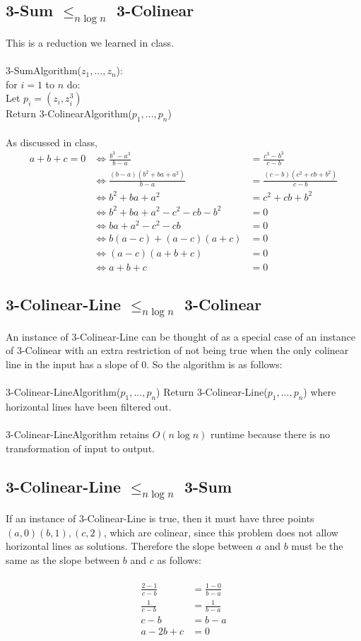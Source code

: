 \documentclass[letterpaper,notitlepage,twoside]{article}
\renewcommand{\iff}{\Leftrightarrow} %
\newcommand\tab[1][1cm]{\hspace*{#1}} %
\begin{document}
\subsection*{3-Sum $\leq_{n \log n}$ 3-Colinear}
This is a reduction we learned in class.
\\\\
3-SumAlgorithm($z_1,...,z_n$):\\
\tab for $i = 1$ to $n$ do:\\
\tab\tab Let $p_i = (z_i, z_i^3)$\\
\tab Return 3-ColinearAlgorithm($p_1,...,p_n$)
\\\\
As discussed in class,
\begin{align*}
a + b + c = 0 &\iff \frac{b^3 - a^3}{b - a} &= \frac{c^3 - b^3}{c - b}\\
&\iff \frac{(b - a)(b^2 + ba + a^2)}{b - a} &= \frac{(c - b)(c^2 + cb + b^2)}{c - b}\\
&\iff b^2 + ba + a^2 &= c^2 + cb + b^2\\
&\iff b^2 + ba + a^2 - c^2 - cb - b^2 &= 0\\
&\iff ba + a^2 - c^2 - cb &= 0\\
&\iff b(a - c) + (a - c)(a + c) &= 0\\
&\iff (a - c)(a + b + c) &= 0\\
&\iff a + b + c &= 0
\end{align*}

\subsection*{3-Colinear-Line $\leq_{n \log n}$  3-Colinear}
An instance of 3-Colinear-Line can be thought of as a special case of an instance of 3-Colinear with an extra restriction of not being true when the only colinear line in the input has a slope of 0. So the algorithm is as follows:
\\\\
3-Colinear-LineAlgorithm($p_1,...,p_n$)
\tab Return 3-Colinear-Line($p_1,...,p_n$) where horizontal lines have been filtered out.
\\\\
3-Colinear-LineAlgorithm retains $O(n \log n)$ runtime because there is no transformation of input to output.

\subsection*{3-Colinear-Line $\leq_{n \log n}$ 3-Sum}
If an instance of 3-Colinear-Line is true, then it must have three points $(a, 0) (b, 1), (c, 2)$, which are colinear, since this problem does not allow horizontal lines as solutions. Therefore the slope between $a$ and $b$ must be the same as the slope between $b$ and $c$ as follows:
\\\\
\begin{align*}
\frac{2 - 1}{c - b} &= \frac{1 - 0}{b - a}\\
\frac{1}{c - b} &= \frac{1}{b - a}\\
c - b &= b - a\\
a - 2b + c &= 0
\end{align*}
\end{document}
